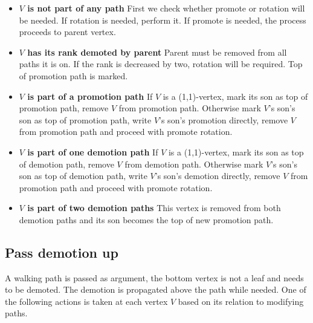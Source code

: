 \begin{itemize}

\item {\bfseries $V$ is not part of any path} First we check whether promote or rotation will be needed. If rotation is needed, perform it. If promote is needed, the process proceeds to parent vertex.

\item {\bfseries $V$ has its rank demoted by parent} Parent must be removed from all paths it is on. If the rank is decreased by two, rotation will be required. Top of promotion path is marked.

\item {\bfseries $V$ is part of a promotion path} If $V$ is a (1,1)-vertex, mark its son as top of promotion path, remove $V$ from promotion path. Otherwise mark $V$'s son's son as top of promotion path, write $V$'s son's promotion directly, remove $V$ from promotion path and proceed with promote rotation. 

\item {\bfseries $V$ is part of one demotion path} If $V$ is a (1,1)-vertex, mark its son as top of demotion path, remove $V$ from demotion path. Otherwise mark $V$'s son's son as top of demotion path, write $V$'s son's demotion directly, remove $V$ from promotion path and proceed with promote rotation.

\item {\bfseries $V$ is part of two demotion paths} This vertex is removed from both demotion paths and its son becomes the top of new promotion path.

\end{itemize}

\subsection{Pass demotion up}

A walking path is passed as argument, the bottom vertex is not a leaf and needs to be demoted. The demotion is propagated above the path while needed. One of the following actions is taken at each vertex $V$ based on its relation to modifying paths.

